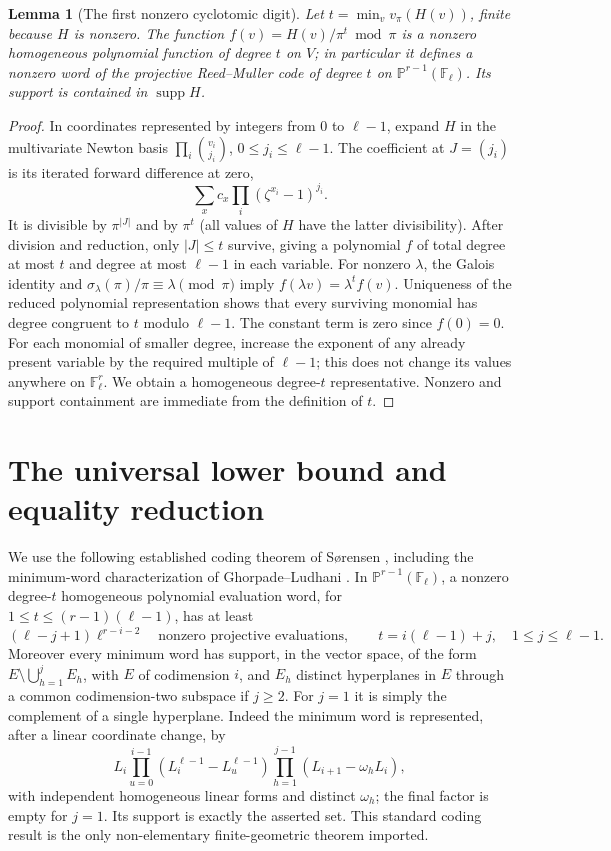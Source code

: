\documentclass[11pt]{article}
\newtheorem{lemma}[theorem]{Lemma}
\theoremstyle{remark}\newtheorem{remark}[theorem]{Remark}
\newcommand{\F}{\mathbb F}
\newcommand{\supp}{\operatorname{supp}}
\newcommand{\PP}{\mathbb P}
\begin{document}
\begin{lemma}[The first nonzero cyclotomic digit]\label{lem:degree}
Let $t=\min_v v_\pi(H(v))$, finite because $H$ is nonzero. The function $f(v)=H(v)/\pi^t\bmod\pi$ is a nonzero homogeneous polynomial function of degree $t$ on $V$; in particular it defines a nonzero word of the projective Reed--Muller code of degree $t$ on $\PP^{r-1}(\F_\ell)$. Its support is contained in $\supp H$.
\end{lemma}
\begin{proof}
In coordinates represented by integers from $0$ to $\ell-1$, expand $H$ in the multivariate Newton basis $\prod_i\binom{v_i}{j_i}$, $0\le j_i\le\ell-1$. The coefficient at $J=(j_i)$ is its iterated forward difference at zero,
\[
 \sum_x c_x\prod_i(\zeta^{x_i}-1)^{j_i}.
\]
It is divisible by $\pi^{|J|}$ and by $\pi^t$ (all values of $H$ have the latter divisibility). After division and reduction, only $|J|\le t$ survive, giving a polynomial $f$ of total degree at most $t$ and degree at most $\ell-1$ in each variable. For nonzero $\lambda$, the Galois identity and $\sigma_\lambda(\pi)/\pi\equiv\lambda\pmod\pi$ imply $f(\lambda v)=\lambda^t f(v)$. Uniqueness of the reduced polynomial representation shows that every surviving monomial has degree congruent to $t$ modulo $\ell-1$. The constant term is zero since $f(0)=0$. For each monomial of smaller degree, increase the exponent of any already present variable by the required multiple of $\ell-1$; this does not change its values anywhere on $\F_\ell^r$. We obtain a homogeneous degree-$t$ representative. Nonzero and support containment are immediate from the definition of $t$.
\end{proof}

\section{The universal lower bound and equality reduction}
We use the following established coding theorem of S\o rensen \cite{Sorensen}, including the minimum-word characterization of Ghorpade--Ludhani \cite[Corollary 3.3 and Theorem 4.3]{GL}. In $\PP^{r-1}(\F_\ell)$, a nonzero degree-$t$ homogeneous polynomial evaluation word, for $1\le t\le(r-1)(\ell-1)$, has at least
\begin{equation}\label{eq:prm}
 (\ell-j+1)\ell^{r-i-2}\quad\text{nonzero projective evaluations},
 \qquad t=i(\ell-1)+j,\quad1\le j\le\ell-1.
\end{equation}
Moreover every minimum word has support, in the vector space, of the form $E\setminus\bigcup_{h=1}^j E_h$, with $E$ of codimension $i$, and $E_h$ distinct hyperplanes in $E$ through a common codimension-two subspace if $j\ge2$. For $j=1$ it is simply the complement of a single hyperplane. Indeed the minimum word is represented, after a linear coordinate change, by
\[
 L_i\prod_{u=0}^{i-1}(L_i^{\ell-1}-L_u^{\ell-1})
 \prod_{h=1}^{j-1}(L_{i+1}-\omega_h L_i),
\]
with independent homogeneous linear forms and distinct $\omega_h$; the final factor is empty for $j=1$. Its support is exactly the asserted set. This standard coding result is the only non-elementary finite-geometric theorem imported.
\end{document}
